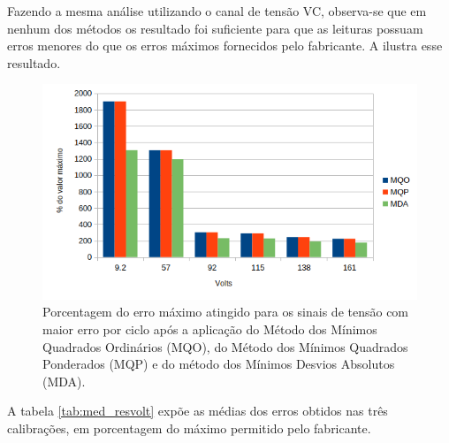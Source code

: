 Fazendo a mesma análise utilizando o canal de tensão VC, observa-se que em nenhum dos métodos os resultado foi suficiente para que as leituras possuam erros menores do que os erros máximos fornecidos pelo fabricante. A  ilustra esse resultado. 

\begin{figure}
    \caption{Porcentagem do erro máximo atingido para os sinais de tensão com maior erro por ciclo após a aplicação do Método dos Mínimos Quadrados Ordinários (MQO), do Método dos Mínimos Quadrados Ponderados (MQP) e do método dos Mínimos Desvios Absolutos (MDA).}
    \label{fig:res_volt}
    \centering
    \includegraphics[width=0.9\linewidth]{pictures/max_err_V_aftercalib.png}
\end{figure}

A tabela \ref{tab:med_resvolt} expõe as médias dos erros obtidos nas três calibrações, em porcentagem do máximo permitido pelo fabricante.

\begin{table}[htb]
\end{table}

